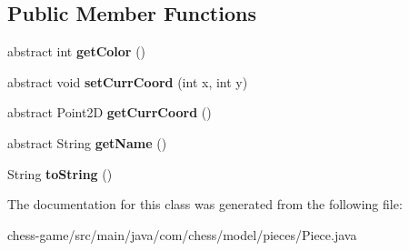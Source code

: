 \subsection*{Public Member Functions}
\begin{DoxyCompactItemize}
\item 
\mbox{\label{classcom_1_1chess_1_1model_1_1pieces_1_1_piece_a55343b00595c732eb2a0b354a0ba55e5}} 
abstract int {\bfseries get\+Color} ()
\item 
\mbox{\label{classcom_1_1chess_1_1model_1_1pieces_1_1_piece_a91ba035e3fb5773b41361ccc7f844226}} 
abstract void {\bfseries set\+Curr\+Coord} (int x, int y)
\item 
\mbox{\label{classcom_1_1chess_1_1model_1_1pieces_1_1_piece_a7b73f5f57db1a6888537cc83e0d44754}} 
abstract Point2D {\bfseries get\+Curr\+Coord} ()
\item 
\mbox{\label{classcom_1_1chess_1_1model_1_1pieces_1_1_piece_a8779736f249fd5d80798545b5d54d0a8}} 
abstract String {\bfseries get\+Name} ()
\item 
\mbox{\label{classcom_1_1chess_1_1model_1_1pieces_1_1_piece_a56e8cd2d57a20bb67b7380516e3e067c}} 
String {\bfseries to\+String} ()
\end{DoxyCompactItemize}


The documentation for this class was generated from the following file\+:\begin{DoxyCompactItemize}
\item 
chess-\/game/src/main/java/com/chess/model/pieces/Piece.\+java\end{DoxyCompactItemize}
